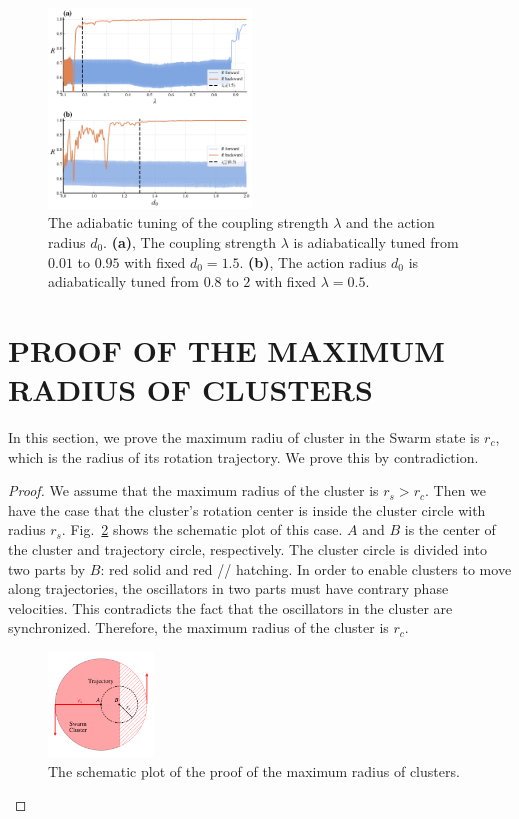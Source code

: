 \documentclass[%
 aip,
 amsmath,amssymb,
 reprint,%
]{revtex4-1}
\begin{document}
\begin{figure}[h]
    \includegraphics[width=0.48\textwidth]{./figs/aditionalTuning.pdf}
    \caption{
        \label{fig:adiabaticTuning} The adiabatic tuning of the coupling strength $\lambda$ and the action radius $d_0$.
        \textbf{(a)}, The coupling strength $\lambda$ is adiabatically tuned from $0.01$ to $0.95$ with fixed $d_0=1.5$.
        \textbf{(b)}, The action radius $d_0$ is adiabatically tuned from $0.8$ to $2$ with fixed $\lambda=0.5$.
    }
\end{figure}

\section{\label{sec:maxRadius} PROOF OF THE MAXIMUM RADIUS OF CLUSTERS}

In this section, we prove the maximum radiu of cluster in the Swarm state is $r_c$, which is the radius of its rotation trajectory. We prove this by contradiction.

\begin{proof}
    We assume that the maximum radius of the cluster is $r_s>r_c$. Then we have the case that the cluster's rotation center is inside the cluster circle with radius $r_s$. 
    Fig.~\ref{fig:rsProofEps} shows the schematic plot of this case. $A$ and $B$ is the center of the cluster and trajectory circle, respectively. The cluster circle is divided into two parts by $B$: red solid and red // hatching. In order to enable clusters to move along trajectories, the oscillators in two parts must have contrary phase velocities. This contradicts the fact that the oscillators in the cluster are synchronized. Therefore, the maximum radius of the cluster is $r_c$.

    \begin{figure}[h]
        \includegraphics[width=0.25\textwidth]{./figs/rsProofEps.pdf}
        \caption{
            \label{fig:rsProofEps} The schematic plot of the proof of the maximum radius of clusters.
        }
    \end{figure}

\end{proof}
\end{document}
